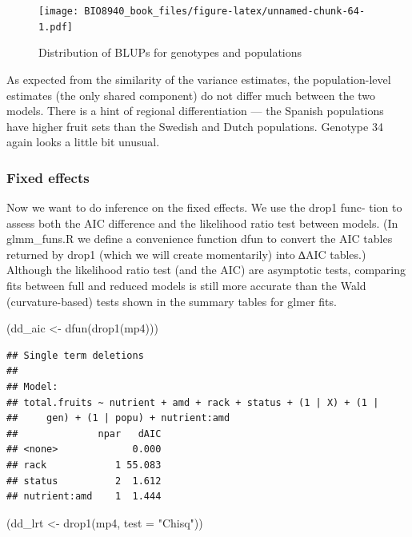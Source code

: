 \documentclass[
  12pt,
]{book}
\newenvironment{Shaded}{\begin{snugshade}}{\end{snugshade}}
\newcommand{\AttributeTok}[1]{\textcolor[rgb]{0.77,0.63,0.00}{#1}}
\newcommand{\FunctionTok}[1]{\textcolor[rgb]{0.00,0.00,0.00}{#1}}
\newcommand{\NormalTok}[1]{#1}
\newcommand{\OtherTok}[1]{\textcolor[rgb]{0.56,0.35,0.01}{#1}}
\newcommand{\StringTok}[1]{\textcolor[rgb]{0.31,0.60,0.02}{#1}}
\begin{document}
\begin{figure}
\centering
\texttt{[image: BIO8940\_book\_files/figure-latex/unnamed-chunk-64-1.pdf]}
\caption{\label{fig:unnamed-chunk-64}Distribution of BLUPs for genotypes and populations}
\end{figure}

As expected from the similarity of the variance estimates, the population-level estimates (the only shared component) do not differ much between the two models. There is a hint of regional differentiation --- the Spanish populations have higher fruit sets than the Swedish and Dutch populations. Genotype 34 again looks a little bit unusual.

\hypertarget{fixed-effects}{%
\subsubsection{Fixed effects}\label{fixed-effects}}

Now we want to do inference on the fixed effects. We use the drop1 func- tion to assess both the AIC difference and the likelihood ratio test between models. (In glmm\_funs.R we define a convenience function dfun to convert the AIC tables returned by drop1 (which we will create momentarily) into ∆AIC tables.) Although the likelihood ratio test (and the AIC) are asymptotic tests, comparing fits between full and reduced models is still more accurate than the Wald (curvature-based) tests shown in the summary tables for glmer fits.

\begin{Shaded}
\begin{Highlighting}[]
\NormalTok{(dd\_aic }\OtherTok{\textless{}{-}} \FunctionTok{dfun}\NormalTok{(}\FunctionTok{drop1}\NormalTok{(mp4)))}
\end{Highlighting}
\end{Shaded}

\begin{verbatim}
## Single term deletions
## 
## Model:
## total.fruits ~ nutrient + amd + rack + status + (1 | X) + (1 | 
##     gen) + (1 | popu) + nutrient:amd
##              npar   dAIC
## <none>             0.000
## rack            1 55.083
## status          2  1.612
## nutrient:amd    1  1.444
\end{verbatim}

\begin{Shaded}
\begin{Highlighting}[]
\NormalTok{(dd\_lrt }\OtherTok{\textless{}{-}} \FunctionTok{drop1}\NormalTok{(mp4, }\AttributeTok{test =} \StringTok{"Chisq"}\NormalTok{))}
\end{Highlighting}
\end{Shaded}
\end{document}
